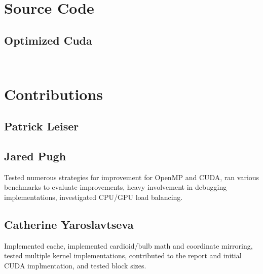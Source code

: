 \documentclass{article}
\begin{document}
\appendix

\section{Source Code}

\subsection{Optimized Cuda}

\begin{lstlisting}[language=C]
    
\end{lstlisting}

\section{Contributions}

\subsection{Patrick Leiser}

\subsection{Jared Pugh}
Tested numerous strategies for improvement for OpenMP and CUDA, ran various benchmarks to evaluate improvements, heavy involvement in debugging implementations, investigated CPU/GPU load balancing.

\subsection{Catherine Yaroslavtseva}
Implemented cache, implemented cardioid/bulb math and coordinate mirroring, tested multiple kernel implementations, contributed to the report and initial CUDA implmentation, and tested block sizes.
\end{document}
